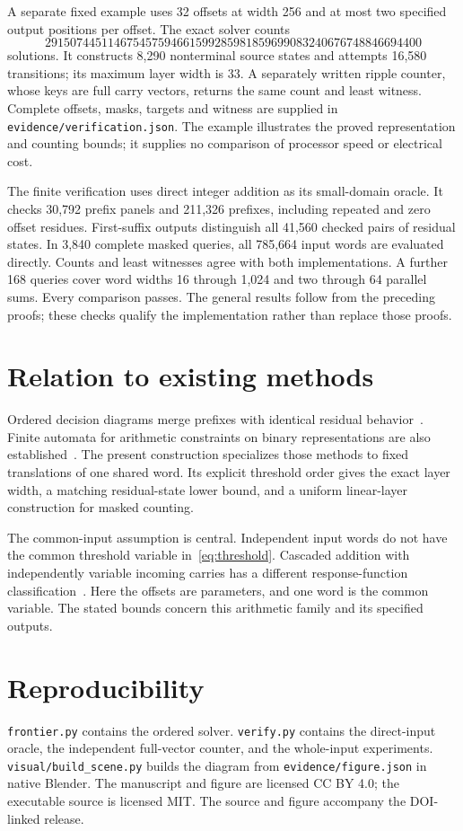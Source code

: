 \documentclass[11pt,a4paper]{article}
\begin{document}
A separate fixed example uses 32 offsets at width 256 and at most two specified
output positions per offset. The exact solver counts
\[
 291507445114675457594661599285981859699083240676748846694400
\]
solutions. It constructs 8,290 nonterminal source states and attempts
16,580 transitions; its maximum layer width is 33.
A separately written ripple counter, whose keys are full carry vectors,
returns the same count and least witness. Complete offsets, masks, targets
and witness are supplied in \texttt{evidence/verification.json}.
The example illustrates the proved representation and counting bounds;
it supplies no comparison of processor speed or electrical cost.

The finite verification uses direct integer addition as its small-domain
oracle. It checks 30,792 prefix panels and 211,326 prefixes, including
repeated and zero offset residues. First-suffix outputs distinguish all
41,560 checked pairs of residual states. In 3,840 complete masked queries,
all 785,664 input words are evaluated directly. Counts and least witnesses
agree with both implementations. A further 168 queries cover word widths
16 through 1,024 and two through 64 parallel sums. Every comparison passes.
The general results follow from the preceding proofs; these checks qualify
the implementation rather than replace those proofs.

\section{Relation to existing methods}
Ordered decision diagrams merge prefixes with identical residual
behavior~\cite{bryant}. Finite automata for arithmetic constraints on binary
representations are also established~\cite{wolper}.
The present construction specializes those methods to fixed translations
of one shared word. Its explicit threshold order gives the exact layer
width, a matching residual-state lower bound, and a uniform linear-layer
construction for masked counting.

The common-input assumption is central. Independent input words do not
have the common threshold variable in~\eqref{eq:threshold}.
Cascaded addition with independently variable incoming carries has a
different response-function classification~\cite{cascade}.
Here the offsets are parameters, and one word is the common variable.
The stated bounds concern this arithmetic family and its specified outputs.

\section*{Reproducibility}
\texttt{frontier.py} contains the ordered solver. \texttt{verify.py} contains
the direct-input oracle, the independent full-vector counter, and the
whole-input experiments. \texttt{visual/build\_scene.py} builds the diagram
from \texttt{evidence/figure.json} in native Blender.
The manuscript and figure are licensed CC BY 4.0; the executable source
is licensed MIT. The source and figure accompany the DOI-linked release.
\end{document}
